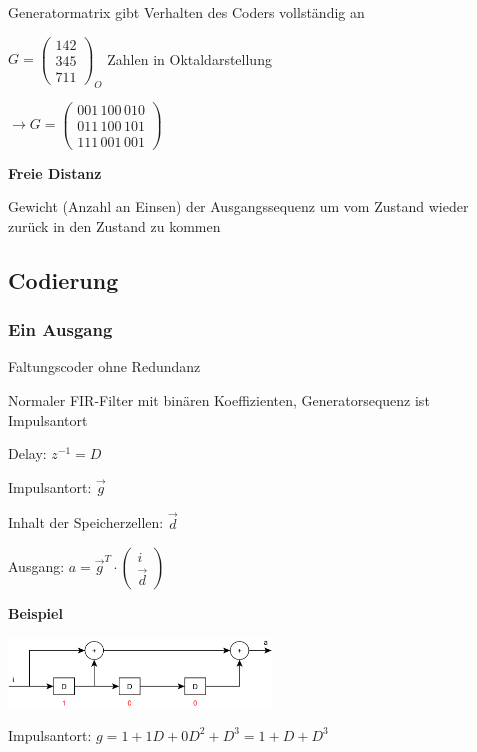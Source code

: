 Generatormatrix gibt Verhalten des Coders vollständig an

$\displaystyle{
    G = \begin{pmatrix}
        142\\
        345\\
        711
    \end{pmatrix}_O
}$ \;\;\;\;\;\; Zahlen in Oktaldarstellung

$\displaystyle{
    \rightarrow G = \begin{pmatrix}
        001\,100\,010\\
        011\,100\,101\\
        111\,001\,001
    \end{pmatrix}
}$

\textbf{Freie Distanz}

Gewicht (Anzahl an Einsen) der Ausgangssequenz um vom Zustand \flqq{} wieder zurück in den Zustand \flqq{}
zu kommen

\subsection{Codierung}

\subsubsection{Ein Ausgang}

Faltungscoder ohne Redundanz

Normaler FIR-Filter mit binären Koeffizienten, Generatorsequenz ist Impulsantort

Delay: $z^{-1} = D$

Impulsantort: $\vec{g}$

Inhalt der Speicherzellen: $\vec{d}$

Ausgang: $\displaystyle{
    a = \vec{g}^T \cdot
    \begin{pmatrix}
        i\\
        \vec{d}
    \end{pmatrix}
}$

\textbf{Beispiel}

\includegraphics[width=7cm]{img/faltungscoder1in1out.PNG}

Impulsantort: $\displaystyle{
    g = 1 + 1D + 0D^2 + D^3 = 1 + D + D^3
}$

